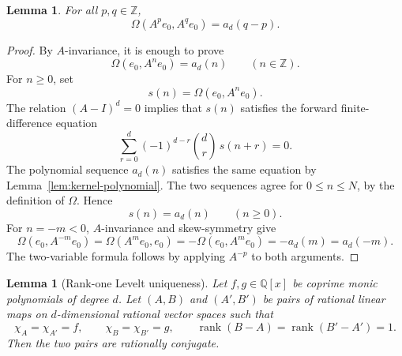 \documentclass[a4paper,11pt]{amsart}
\newtheorem{lemma}[theorem]{Lemma}
\theoremstyle{remark}
\newcommand{\Z}{\mathbb Z}
\newcommand{\Q}{\mathbb Q}
\DeclareMathOperator{\rank}{rank}
\numberwithin{equation}{section}
\begin{document}
\begin{lemma}\label{lem:orbit-gram}
For all \(p,q\in\Z\),
\[
        \Omega(A^pe_0,A^qe_0)=a_d(q-p).
\]
\end{lemma}

\begin{proof}
By \(A\)-invariance, it is enough to prove
\[
        \Omega(e_0,A^ne_0)=a_d(n)
        \qquad(n\in\Z).
\]
For \(n\ge0\), set
\[
        s(n)=\Omega(e_0,A^ne_0).
\]
The relation \((A-I)^d=0\) implies that \(s(n)\) satisfies the forward finite-difference equation
\[
        \sum_{r=0}^{d}(-1)^{d-r}\binom dr\,s(n+r)=0.
\]
The polynomial sequence \(a_d(n)\) satisfies the same equation by Lemma~\ref{lem:kernel-polynomial}.  The two sequences agree for \(0\le n\le N\), by the definition of \(\Omega\).  Hence
\[
        s(n)=a_d(n)
        \qquad(n\ge0).
\]
For \(n=-m<0\), \(A\)-invariance and skew-symmetry give
\[
        \Omega(e_0,A^{-m}e_0)
        =
        \Omega(A^me_0,e_0)
        =
        -\Omega(e_0,A^me_0)
        =
        -a_d(m)
        =
        a_d(-m).
\]
The two-variable formula follows by applying \(A^{-p}\) to both arguments.
\end{proof}

\begin{lemma}[Rank-one Levelt uniqueness]\label{lem:levelt}
Let \(f,g\in\Q[x]\) be coprime monic polynomials of degree \(d\).  Let \((A,B)\) and \((A',B')\) be pairs of rational linear maps on \(d\)-dimensional rational vector spaces such that
\[
        \chi_A=\chi_{A'}=f,
        \qquad
        \chi_B=\chi_{B'}=g,
        \qquad
        \rank(B-A)=\rank(B'-A')=1.
\]
Then the two pairs are rationally conjugate.
\end{lemma}
\end{document}
